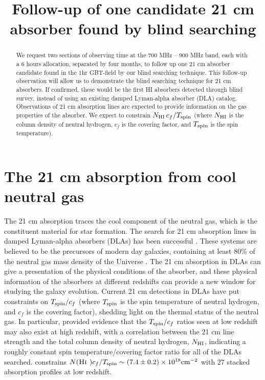 \documentclass[prl,twocolumn,floatfix,superscriptaddress,nofootinbib,aps]{revtex4}
\def\hi{\textsc{Hi~}}
\begin{document}
\title{Follow-up of one candidate 21 cm absorber found by blind searching}




\begin{abstract}
We request two sections of observing time at the 700 MHz -- 900 MHz band,
each with a 6 hours allocation, separated by four months, 
to follow up one 21 cm absorber candidate found in the 1hr GBT-field by our blind searching technique. 
This follow-up observation will allow us to demonstrate the blind searching technique for 21 cm absorbers. 
If confirmed, these would be the first HI absorbers detected through blind survey, instead of using 
an existing damped Lyman-alpha absorber (DLA) catalog. Observations of 21 cm absorption lines are expected 
to provide information on the gas properties of the absorber. We expect to constrain 
$N_{\rm HI}\,c_f/T_{\rm spin}$ (where $N_{\rm HI}$ is the column density of neutral hydrogen, 
$c_f$ is the covering factor, and $T_{\rm spin}$ is the spin temperature).
\end{abstract}

\maketitle

\section{The 21 cm absorption from cool neutral gas}
The 21 cm absorption traces the cool component of the neutral gas, 
which is the constituent material 
for star formation. The search for 21 cm absorption lines in damped 
Lyman-alpha absorbers (DLAs) has been successful 
\cite{2006MNRAS.370L..46K,2007MNRAS.375.1528K,2007MNRAS.382L..53Y,
2010MNRAS.402...35C,2014A&A...569A..35G,2011ApJ...727...52B,2015A&A...575A..44G}. 
These systems are believed to be the precursors of modern day galaxies, 
containing at least 80\% of the neutral gas mass density of the Universe
\cite{2005ApJ...635..123P}. The 21 cm absorption in DLAs can give a presentation of the physical conditions of the absorber, and these physical information of the absorbers at different redshifts can provide a new window for studying the galaxy evolution.  
Current 21 cm detections in DLAs have put constraints on $T_{\rm spin} /c_f$ 
(where $T_{\rm spin}$ is the spin temperature of neutral hydrogen, and 
$c_f$ is the covering factor), shedding light on the thermal status of 
the neutral gas. In particular, \citet{2010MNRAS.402...35C} provided evidence that the 
$T_{\rm spin}/c_f$ ratios seen at low redshift may also exist at high redshift, 
with a correlation between the 21 cm line strength and the total column density
of neutral hydrogen, $N_{\rm HI}$, indicating a roughly constant spin 
temperature/covering factor ratio for all of the DLAs searched.
\citet{2014A&A...569A..35G} constrains 
$N(\hi)c_f/T_{\rm spin}\sim(7.4\pm0.2)\times10^{18}\rm cm^{-2}$ with 
$27$ stacked absorption profiles at low redshift.
\end{document}
